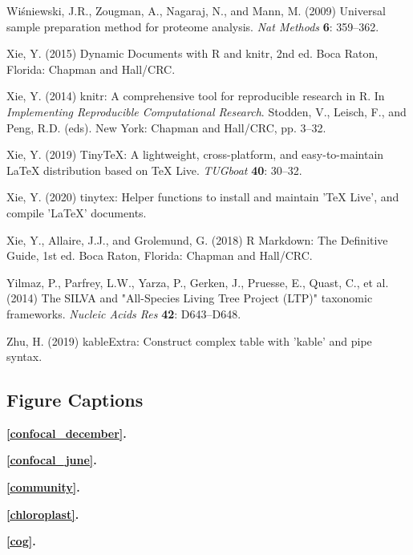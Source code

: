 \documentclass[12pt,]{article}
\begin{document}
\leavevmode\hypertarget{ref-Wisniewski2009}{}%
Wiśniewski, J.R., Zougman, A., Nagaraj, N., and Mann, M. (2009)
Universal sample preparation method for proteome analysis. \emph{Nat
Methods} \textbf{6}: 359--362.

\leavevmode\hypertarget{ref-Xie2015}{}%
Xie, Y. (2015) Dynamic Documents with R and knitr, 2nd ed. Boca Raton,
Florida: Chapman and Hall/CRC.

\leavevmode\hypertarget{ref-Xie2014}{}%
Xie, Y. (2014) knitr: A comprehensive tool for reproducible research in
R. In \emph{Implementing Reproducible Computational Research}. Stodden,
V., Leisch, F., and Peng, R.D. (eds). New York: Chapman and Hall/CRC,
pp. 3--32.

\leavevmode\hypertarget{ref-Xie2019a}{}%
Xie, Y. (2019) TinyTeX: A lightweight, cross-platform, and
easy-to-maintain LaTeX distribution based on TeX Live. \emph{TUGboat}
\textbf{40}: 30--32.

\leavevmode\hypertarget{ref-Xie2020}{}%
Xie, Y. (2020) tinytex: Helper functions to install and maintain 'TeX
Live', and compile 'LaTeX' documents.

\leavevmode\hypertarget{ref-Xie2018}{}%
Xie, Y., Allaire, J.J., and Grolemund, G. (2018) R Markdown: The
Definitive Guide, 1st ed. Boca Raton, Florida: Chapman and Hall/CRC.

\leavevmode\hypertarget{ref-Yilmaz2014}{}%
Yilmaz, P., Parfrey, L.W., Yarza, P., Gerken, J., Pruesse, E., Quast,
C., et al. (2014) The SILVA and "All-Species Living Tree Project (LTP)"
taxonomic frameworks. \emph{Nucleic Acids Res} \textbf{42}: D643--D648.

\leavevmode\hypertarget{ref-Zhu2019}{}%
Zhu, H. (2019) kableExtra: Construct complex table with 'kable' and pipe
syntax.

\newpage 
\setlength\parindent{0pt}

\hypertarget{figure-captions}{%
\subsection{Figure Captions}\label{figure-captions}}

\textbf{\autoref{confocal_december}.} 

\textbf{\autoref{confocal_june}.} 

\textbf{\autoref{community}.} 

\textbf{\autoref{chloroplast}.} 

\textbf{\autoref{cog}.} 
\end{document}
